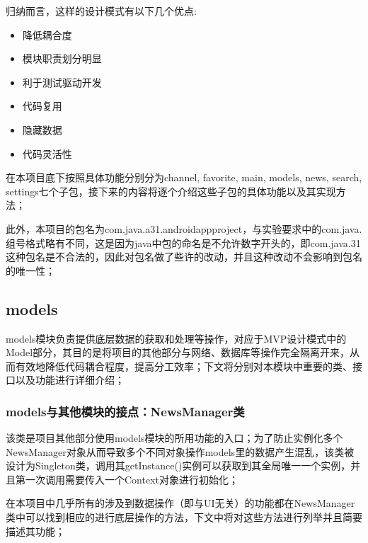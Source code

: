 \documentclass[UTF8]{ctexart}
\begin{document}
归纳而言，这样的设计模式有以下几个优点:
\begin{itemize}
    \item 降低耦合度 
    \item 模块职责划分明显 
    \item 利于测试驱动开发 
    \item 代码复用 
    \item 隐藏数据 
    \item 代码灵活性
\end{itemize}

在本项目底下按照具体功能分别分为channel, favorite, main, models, news, search, settings七个子包，接下来的内容将逐个介绍这些子包的具体功能以及其实现方法；

此外，本项目的包名为com.java.a31.androidappproject，与实验要求中的com.java.组号格式略有不同，这是因为java中包的命名是不允许数字开头的，即com.java.31这种包名是不合法的，因此对包名做了些许的改动，并且这种改动不会影响到包名的唯一性；

\subsection{models}

	models模块负责提供底层数据的获取和处理等操作，对应于MVP设计模式中的Model部分，其目的是将项目的其他部分与网络、数据库等操作完全隔离开来，从而有效地降低代码耦合程度，提高分工效率；下文将分别对本模块中重要的类、接口以及功能进行详细介绍；

    \subsubsection{models与其他模块的接点：NewsManager类}
    	该类是项目其他部分使用models模块的所用功能的入口；为了防止实例化多个NewsManager对象从而导致多个不同对象操作models里的数据产生混乱，该类被设计为Singleton类，调用其getInstance()实例可以获取到其全局唯一一个实例，并且第一次调用需要传入一个Context对象进行初始化；

	在本项目中几乎所有的涉及到数据操作（即与UI无关）的功能都在NewsManager类中可以找到相应的进行底层操作的方法，下文中将对这些方法进行列举并且简要描述其功能；
\end{document}
